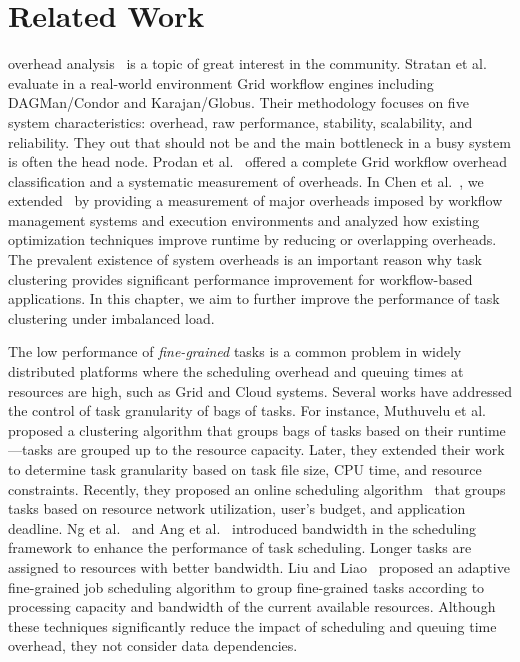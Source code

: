 \section{Related Work}
\label{sec:related-work}

overhead analysis~\cite{Ostberg2011, Prodan2008} is a topic of great interest in the  community. Stratan et al.~\cite{Stratan2008} evaluate in a real-world environment Grid workflow engines including DAGMan/Condor and Karajan/Globus. Their methodology focuses on five system characteristics: overhead, raw performance, stability, scalability, and reliability. They  out that should not be  and  the main bottleneck in a busy system is often the head node. Prodan et al.~\cite{Prodan2008} offered a complete Grid workflow overhead classification and a systematic measurement of overheads. In Chen et al.~\cite{Chen2011}, we extended~\cite{Prodan2008} by providing a measurement of major overheads imposed by workflow management systems and execution environments and analyzed how existing optimization techniques improve runtime by reducing or overlapping overheads. The prevalent existence of system overheads is an important reason why task clustering provides significant performance improvement for workflow-based applications. In this chapter, we aim to further improve the performance of task clustering under imbalanced load. 

The low performance of \emph{fine-grained} tasks is a common problem in widely distributed platforms where the scheduling overhead and queuing times at resources are high, such as Grid and Cloud systems. Several works have addressed the control of task granularity of bags of tasks. For instance, Muthuvelu et al.~\cite{Muthuvelu:2005:DJG:1082290.1082297} proposed a clustering algorithm that groups bags of tasks based on their runtime---tasks are grouped up to the resource capacity. Later, they extended their work~\cite{4493929} to determine task granularity based on task file size, CPU time, and resource constraints. Recently, they proposed an online scheduling algorithm~\cite{Muthuvelu2010,Muthuvelu2013170} that groups tasks based on resource network utilization, user's budget, and application deadline. Ng et al.~\cite{keat-2006} and Ang et al.~\cite{ang-2009} introduced bandwidth in the scheduling framework to enhance the performance of task scheduling. Longer tasks are assigned to resources with better bandwidth. Liu and Liao~\cite{Liu2009} proposed an adaptive fine-grained job scheduling algorithm to group fine-grained tasks according to processing capacity and bandwidth of the current available resources. Although these techniques significantly reduce the impact of scheduling and queuing time overhead, they  not consider data dependencies.

